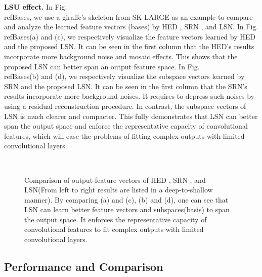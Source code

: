 \documentclass[runningheads]{llncs}
\begin{document}
\textbf{LSU effect.}
In Fig.\\ref{Bases}, we use a giraffe's skeleton from SK-LARGE as an example to compare and analyze the learned feature vectors (bases) by HED \cite{ref6}, SRN \cite{ref6}, and LSN. In Fig.\\ref{Bases}(a) and (c), we respectively visualize the feature vectors learned by HED \cite{ref6} and the proposed LSN. It can be seen in the first column that the HED's results incorporate more background noise and mosaic effects. This shows that the proposed LSN can better span an output feature space. In Fig.\\ref{Bases}(b) and (d), we respectively visualize the subspace vectors learned by SRN \cite{ref1} and the proposed LSN. It can be seen in the first column that the SRN's results incorporate more background noises. It requires to depress such noises by using a residual reconstruction procedure. In contrast, the subspace vectors of LSN is much clearer and compacter. This fully demonstrates that LSN can better span the output space and enforce the representative capacity of convolutional features, which will ease the problems of fitting complex outputs with limited convolutional layers. 

\begin{figure}[t]
\centering
{}
\quad 
{} \\
\quad 
{}
\caption{Comparison of output feature vectors of HED \cite{ref6}, SRN \cite{ref1}, and LSN(From left to right results are listed in a deep-to-shallow manner). By comparing (a) and (c), (b) and (d), one can see that LSN can learn better feature vectors and subspaces(basis) to span the output space. It enforces the representative capacity of convolutional features to fit complex outputs with limited convolutional layers.
}
\label{Bases}
\end{figure}

\subsection{Performance and Comparison}
\end{document}
